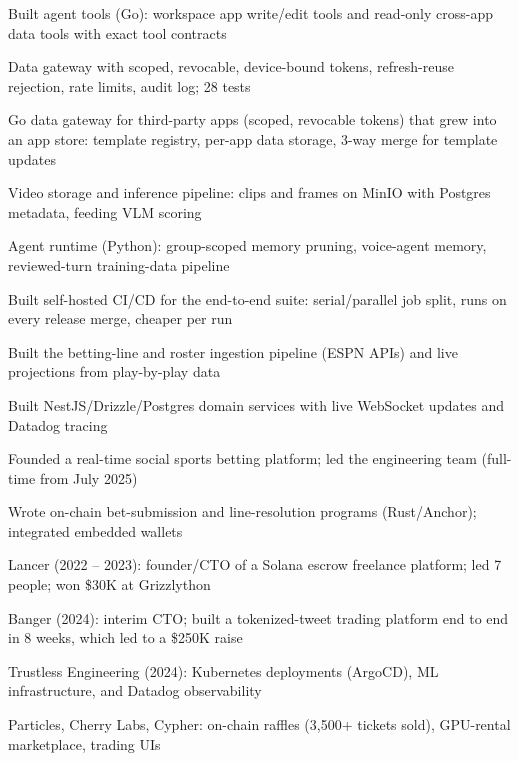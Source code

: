 \documentclass[print]{jack-resume}
\begin{document}
\begin{tightemize}
    \item Built agent tools (Go): workspace app write/edit tools and read-only cross-app data tools with exact tool contracts
    \item Data gateway with scoped, revocable, device-bound tokens, refresh-reuse rejection, rate limits, audit log; 28 tests
    \item Go data gateway for third-party apps (scoped, revocable tokens) that grew into an app store: template registry, per-app data storage, 3-way merge for template updates
    \item Video storage and inference pipeline: clips and frames on MinIO with Postgres metadata, feeding VLM scoring
    \item Agent runtime (Python): group-scoped memory pruning, voice-agent memory, reviewed-turn training-data pipeline
    \item Built self-hosted CI/CD for the end-to-end suite: serial/parallel job split, runs on every release merge, cheaper per run
\end{tightemize}
\sectionsep

\begin{tightemize}
    \item Built the betting-line and roster ingestion pipeline (ESPN APIs) and live projections from play-by-play data
    \item Built NestJS/Drizzle/Postgres domain services with live WebSocket updates and Datadog tracing
    \item Founded a real-time social sports betting platform; led the engineering team (full-time from July 2025)
    \item Wrote on-chain bet-submission and line-resolution programs (Rust/Anchor); integrated embedded wallets
\end{tightemize}
\sectionsep

\begin{tightemize}
    \item Lancer (2022 – 2023): founder/CTO of a Solana escrow freelance platform; led 7 people; won \$30K at Grizzlython
    \item Banger (2024): interim CTO; built a tokenized-tweet trading platform end to end in 8 weeks, which led to a \$250K raise
    \item Trustless Engineering (2024): Kubernetes deployments (ArgoCD), ML infrastructure, and Datadog observability
    \item Particles, Cherry Labs, Cypher: on-chain raffles (3,500+ tickets sold), GPU-rental marketplace, trading UIs
\end{tightemize}
\sectionsep
\end{document}
